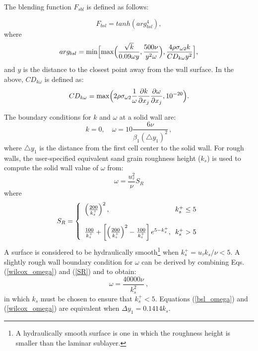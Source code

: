 The blending function $F_{sbl}$ is defined as follows:

\begin{equation}
F_{bsl} = tanh(arg^{4}_{bsl}),
\end{equation}
where
\begin{equation}
arg_{bsl} = \min \Bigl[ \max \Bigl (\frac{\sqrt{k}}{0.09 \omega y},
\frac{500 \nu}{y^2 \omega} \Bigr),
\frac{4 \rho \sigma_{\omega 2} k}{C D_{k\omega} y^2} \Bigr],
\end{equation}
and $y$ is the distance to the closest point away from the wall surface.
In the above, $CD_{k \omega}$ is defined as:
\begin{equation}
CD_{k \omega} = \max \Bigl(2 \rho \sigma_{\omega 2} \frac{1}{\omega}
\frac{\partial k}
{\partial x_{j}} \frac{\partial \omega}{\partial x_{j}}, 10^{-20}
\Bigr).
\end{equation}

The boundary conditions for $k$ and $\omega$ at a solid wall are:
\begin{equation}
k=0, \quad \omega = 10 \frac{6 \nu}{\beta_1 (\bigtriangleup y_1)^2}\,,
\label{bsl_omega}
\end{equation}
where $\bigtriangleup y_1$ is the distance from the first cell center
to the solid wall.  For rough walls, the user-specified equivalent sand grain roughness height ($k_s$)
is used to compute the solid wall value of $\omega$ from:
\begin{equation}
\omega = \frac{u_{\tau}^2}{\nu}S_R
\label{wilcox_omega}
\end{equation}
where
\begin{equation}
S_R =  \left\{ \begin{array} {l@{\,\,}r}
\left(\frac{200}{k_s^+}\right)^2 ,
& \ k_s^+ \leq 5 \\ \\
\frac{100}{k_s^+} + \left[ \left(\frac{200}{k_s^+}\right)^2 - \frac{100}{k_s^+} \right] e^{5 - k_s^+} ,
& \ k_s^+ > 5 \\
\end{array} \right. \label{SR}
\end{equation}
A surface is considered to be hydraulically smooth\footnote{A hydraulically smooth surface is one in which the roughness height is smaller than the laminar sublayer.} when $k_s^+ = u_{\tau} k_s / \nu < 5$.  A slightly rough wall boundary condition for $\omega$ can be derived by combining Eqs. (\ref{wilcox_omega}) and (\ref{SR}) and to obtain\cite{wilcox.08}:
\begin{equation}
\omega = \frac{40000 \nu}{k_s^2} ~ ,
\end{equation}
in which $k_s$ must be chosen to ensure that $k_s^+ < 5$.  Equations (\ref{bsl_omega}) and (\ref{wilcox_omega}) are equivalent when $\Delta y_1 = 0.1414 k_s$.


